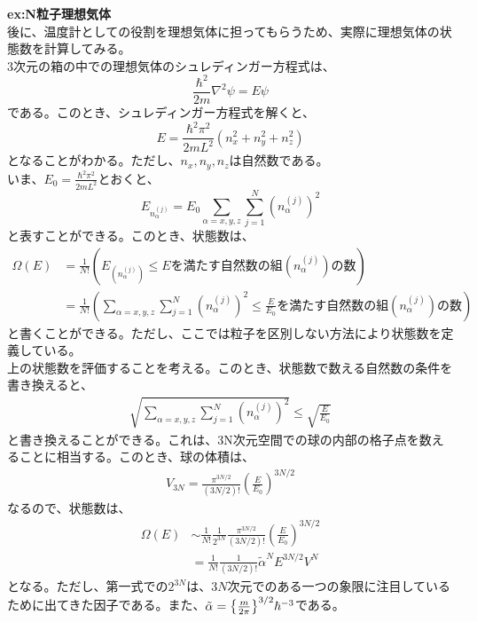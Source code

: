 \documentclass[a4paper,11pt]{jsarticle}
\numberwithin{equation}{section}
\begin{document}
\textbf{ex:N粒子理想気体}\\
後に、温度計としての役割を理想気体に担ってもらうため、実際に理想気体の状態数を計算してみる。\\
3次元の箱の中での理想気体のシュレディンガー方程式は、
\begin{equation}
  \frac{\hbar^2}{2m}\nabla^2 \psi = E \psi
\end{equation}
である。このとき、シュレディンガー方程式を解くと、
\begin{equation}
  E = \frac{\hbar^2 \pi^2}{2mL^2}(n_x^2+n_y^2+n_z^2)
\end{equation}
となることがわかる。ただし、$n_x,n_y,n_z$は自然数である。\\
いま、$E_0 = \frac{\hbar^2 \pi^2}{2mL^2}$とおくと、
\begin{equation}
  E_{n_{\alpha}^{(j)}} = E_0 \sum_{\alpha = x,y,z} \sum_{j=1}^{N} (n_{\alpha}^{(j)})^2
\end{equation}
と表すことができる。このとき、状態数は、
\begin{align}
  \Omega(E) &= \frac{1}{N!} (E_{(n_{\alpha}^{(j)})} \leq E \text{を満たす自然数の組}(n_{\alpha}^{(j)})\text{の数})\\
  &= \frac{1}{N!} (\sum_{\alpha = x,y,z} \sum_{j=1}^{N} (n_{\alpha}^{(j)})^2 \leq \frac{E}{E_0} \text{を満たす自然数の組}(n_{\alpha}^{(j)})\text{の数})
\end{align}
と書くことができる。ただし、ここでは粒子を区別しない方法により状態数を定義している。\\
上の状態数を評価することを考える。このとき、状態数で数える自然数の条件を書き換えると、
\begin{align}
  \sqrt{\sum_{\alpha = x,y,z} \sum_{j=1}^{N} (n_{\alpha}^{(j)})^2} \leq \sqrt{\frac{E}{E_0}}
\end{align}
と書き換えることができる。これは、3N次元空間での球の内部の格子点を数えることに相当する。このとき、球の体積は、
\begin{align}
  V_{3N} = \frac{\pi^{3N/2}}{(3N/2)!}(\frac{E}{E_0})^{3N/2}
\end{align}
なるので、状態数は、
\begin{align}
  \Omega(E) &\sim \frac{1}{N!} \frac{1}{2^{3N}} \frac{\pi^{3N/2}}{(3N/2)!}(\frac{E}{E_0})^{3N/2}\\
  &= \frac{1}{N!} \frac{1}{(3N/2)!}\tilde{\alpha}^N E^{3N/2}V^{N} \label{eq:idealgas}
\end{align}
となる。ただし、第一式での$2^{3N}$は、$3N$次元でのある一つの象限に注目しているために出てきた因子である。また、$\tilde{\alpha}= \qty{\frac{m}{2\pi}}^{3/2}\hbar^{-3}$である。\\
\end{document}
